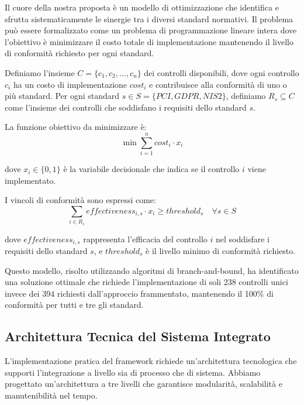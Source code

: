 Il cuore della nostra proposta è un modello di ottimizzazione che identifica e sfrutta sistematicamente le sinergie tra i diversi standard normativi. Il problema può essere formalizzato come un problema di programmazione lineare intera dove l'obiettivo è minimizzare il costo totale di implementazione mantenendo il livello di conformità richiesto per ogni standard.

Definiamo l'insieme $C = \{c_1, c_2, ..., c_n\}$ dei controlli disponibili, dove ogni controllo $c_i$ ha un costo di implementazione $cost_i$ e contribuisce alla conformità di uno o più standard. Per ogni standard $s \in S = \{PCI, GDPR, NIS2\}$, definiamo $R_s \subseteq C$ come l'insieme dei controlli che soddisfano i requisiti dello standard $s$.

La funzione obiettivo da minimizzare è:
\begin{equation}
\min \sum_{i=1}^{n} cost_i \cdot x_i
\end{equation}

dove $x_i \in \{0,1\}$ è la variabile decisionale che indica se il controllo $i$ viene implementato.

I vincoli di conformità sono espressi come:
\begin{equation}
\sum_{i \in R_s} effectiveness_{i,s} \cdot x_i \geq threshold_s \quad \forall s \in S
\end{equation}

dove $effectiveness_{i,s}$ rappresenta l'efficacia del controllo $i$ nel soddisfare i requisiti dello standard $s$, e $threshold_s$ è il livello minimo di conformità richiesto.

Questo modello, risolto utilizzando algoritmi di branch-and-bound, ha identificato una soluzione ottimale che richiede l'implementazione di soli 238 controlli unici invece dei 394 richiesti dall'approccio frammentato, mantenendo il 100\% di conformità per tutti e tre gli standard.

\subsection{Architettura Tecnica del Sistema Integrato}
\label{subsec:4.3.2_architettura}

L'implementazione pratica del framework richiede un'architettura tecnologica che supporti l'integrazione a livello sia di processo che di sistema. Abbiamo progettato un'architettura a tre livelli che garantisce modularità, scalabilità e manutenibilità nel tempo.

